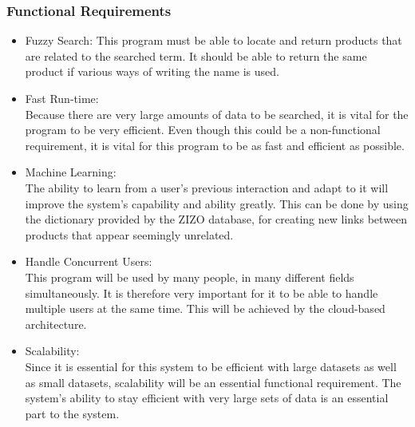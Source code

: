 \documentclass[a4paper,10pt]{article}
\begin{document}
	\subsubsection{Functional Requirements} 
		\begin{itemize}
		\item Fuzzy Search: This program must be able to locate and return products that are related to the searched term. It should be able to return the same product if various ways of writing the name is used.
	
		\item Fast Run-time:\\
			Because there are very large amounts of data to be searched, it is vital for the program to be very efficient.  Even though this could be a non-functional requirement, it is vital for this program to be as fast and efficient as possible.
			
		\item Machine Learning:\\
			The ability to learn from a user's previous interaction and adapt to it will improve the system’s capability and ability greatly. This can be done by using the dictionary provided by the ZIZO database, for creating new links between products that appear seemingly unrelated.\\
	
		\item Handle Concurrent Users:\\
			This program will be used by many people, in many different fields simultaneously. It is therefore very important for it to be able to handle multiple users at the same time. This will be achieved by the cloud-based architecture.
	
		\item Scalability:\\
			Since it is essential for this system to be efficient with large datasets as well as small datasets, scalability will be an essential functional requirement. The system’s ability to stay efficient with very large sets of data is an essential part to the system.
		 \end{itemize}
\end{document}
